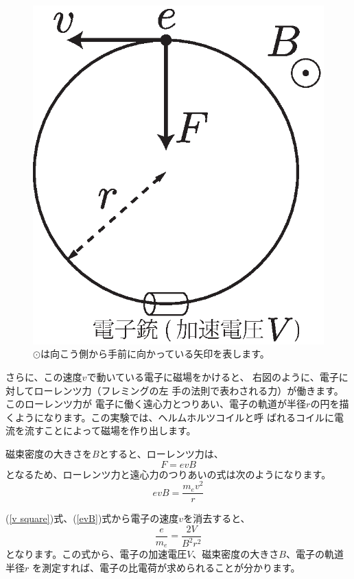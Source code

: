 \begin{figure}
\vspace*{-0.5cm}
\hspace*{0.5cm}\includegraphics[scale=0.5]{11_CTMratio/CTMratio.eps}\\
$\odot$は向こう側から手前に向かっている矢印を表します。
\end{figure}

さらに、この速度$v$で動いている電子に磁場をかけると、
右図のように、電子に対してローレンツ力（フレミングの左
手の法則で表わされる力）が働きます。このローレンツ力が
電子に働く遠心力とつりあい、電子の軌道が半径$r$の円を描
くようになります。この実験では、ヘルムホルツコイルと呼
ばれるコイルに電流を流すことによって磁場を作り出します。


磁束密度の大きさを$B$とすると、ローレンツ力は、
\[
F=evB
\]
となるため、ローレンツ力と遠心力のつりあいの式は次のようになります。
\begin{equation}
evB=\frac{m_e v^2}{r}
\label{evB}
\end{equation}

(\ref{v square})式、(\ref{evB})式から電子の速度$v$を消去すると、
\begin{equation}
\boxed{
\frac{e}{m_e}=\frac{2V}{B^2r^2}
}
\end{equation}
となります。この式から、電子の加速電圧$V$、磁束密度の大きさ$B$、電子の軌道半径$r$ 
を測定すれば、電子の比電荷が求められることが分かります。

